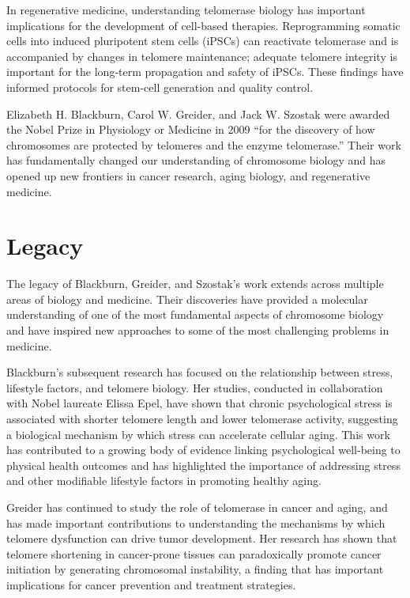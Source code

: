 In regenerative medicine, understanding telomerase biology has important implications for the development of cell-based therapies. Reprogramming somatic cells into induced pluripotent stem cells (iPSCs) can reactivate telomerase and is accompanied by changes in telomere maintenance; adequate telomere integrity is important for the long-term propagation and safety of iPSCs. These findings have informed protocols for stem-cell generation and quality control.

Elizabeth H. Blackburn, Carol W. Greider, and Jack W. Szostak were awarded the Nobel Prize in Physiology or Medicine in 2009 ``for the discovery of how chromosomes are protected by telomeres and the enzyme telomerase.'' Their work has fundamentally changed our understanding of chromosome biology and has opened up new frontiers in cancer research, aging biology, and regenerative medicine.

\section{Legacy}

The legacy of Blackburn, Greider, and Szostak's work extends across multiple areas of biology and medicine. Their discoveries have provided a molecular understanding of one of the most fundamental aspects of chromosome biology and have inspired new approaches to some of the most challenging problems in medicine.

Blackburn's subsequent research has focused on the relationship between stress, lifestyle factors, and telomere biology. Her studies, conducted in collaboration with Nobel laureate Elissa Epel, have shown that chronic psychological stress is associated with shorter telomere length and lower telomerase activity, suggesting a biological mechanism by which stress can accelerate cellular aging. This work has contributed to a growing body of evidence linking psychological well-being to physical health outcomes and has highlighted the importance of addressing stress and other modifiable lifestyle factors in promoting healthy aging.

Greider has continued to study the role of telomerase in cancer and aging, and has made important contributions to understanding the mechanisms by which telomere dysfunction can drive tumor development. Her research has shown that telomere shortening in cancer-prone tissues can paradoxically promote cancer initiation by generating chromosomal instability, a finding that has important implications for cancer prevention and treatment strategies.

